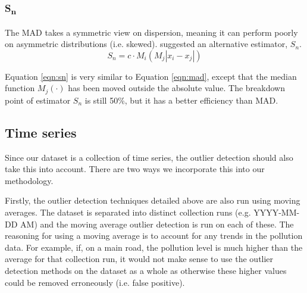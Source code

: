 \documentclass[11pt]{report}
\begin{document}

\subsubsection{S\textsubscript{n}} \label{sn}

The MAD takes a symmetric view on dispersion, meaning it can perform poorly on asymmetric distributions (i.e. skewed). \cite{rousseeuw1993alternatives} suggested an alternative estimator, $S_n$.
\begin{equation} \label{eqn:sn}
S_n = c \cdot M_i ( M_j | x_i - x_j | )
\end{equation}

Equation \ref{eqn:sn} is very similar to Equation \ref{eqn:mad}, except that the median function $M_j(\cdot)$ has been moved outside the absolute value. The breakdown point of estimator $S_n$ is still 50\%, but it has a better efficiency than MAD.


\subsection{Time series} \label{time_series_incorp}

Since our dataset is a collection of time series, the outlier detection should also take this into account. There are two ways we incorporate this into our methodology.

Firstly, the outlier detection techniques detailed above are also run using moving averages. The dataset is separated into distinct collection runs (e.g. YYYY-MM-DD AM) and the moving average outlier detection is run on each of these. The reasoning for using a moving average is to account for any trends in the pollution data. For example, if, on a main road, the pollution level is much higher than the average for that collection run, it would not make sense to use the outlier detection methods on the dataset as a whole as otherwise these higher values could be removed erroneously (i.e. false positive).
\end{document}
